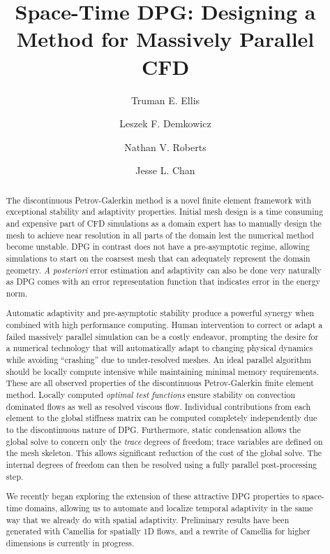 \documentclass[letterpaper]{article}
\title{Space-Time DPG: Designing a Method for Massively Parallel CFD}
\author[1]{Truman E. Ellis}
\author[1]{Leszek F. Demkowicz}
\author[2]{Nathan V. Roberts}
\author[3]{Jesse L. Chan}
\affil[1]{Institute for Computational Engineering and Sciences, University of Texas at Austin}
\affil[2]{Argonne Leadership Computing Facility, Argonne National Laboratory}
\affil[3]{Computational and Applied Math, Rice University}
\date{}
\begin{document}
\maketitle

\begin{abstract}
The discontinuous Petrov-Galerkin method is a novel finite element framework with exceptional stability and adaptivity properties.
Initial mesh design is a time consuming and expensive part of CFD simulations as a domain expert has to manually design the 
mesh to achieve near resolution in all parts of the domain lest the numerical method become unstable.
DPG in contrast does not have a pre-asymptotic regime, allowing simulations to start on the coarsest mesh that can adequately represent the domain geometry.
\emph{A posteriori} error estimation and adaptivity can also be done very naturally as DPG comes with an error representation function 
that indicates error in the energy norm.

Automatic adaptivity and pre-asymptotic stability produce a powerful synergy when combined with high performance computing.
Human intervention to correct or adapt a failed massively parallel simulation can be a costly endeavor, prompting the desire for a
numerical technology that will automatically adapt to changing physical dynamics while avoiding ``crashing'' due to under-resolved meshes.
An ideal parallel algorithm should be locally compute intensive while maintaining minimal memory requirements.
These are all observed properties of the discontinuous Petrov-Galerkin finite element method.
Locally computed \emph{optimal test functions} ensure stability on convection dominated flows as well as resolved viscous flow.
Individual contributions from each element to the global stiffness matrix can be computed completely independently due to the discontinuous nature of DPG.
Furthermore, static condensation allows the global solve to concern only the \emph{trace} degrees of freedom; 
trace variables are defined on the mesh skeleton.  
This allows significant reduction of the cost of the global solve.  
The internal degrees of freedom can then be resolved using a fully parallel post-processing step.

We recently began exploring the extension of these attractive DPG properties to space-time domains, allowing us to automate and localize temporal adaptivity
in the same way that we already do with spatial adaptivity. Preliminary results have been generated with Camellia\cite{Roberts2011} for spatially 1D flows,
and a rewrite of Camellia for higher dimensions is currently in progress.
\end{abstract}



\end{document}
